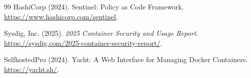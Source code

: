 \documentclass[11pt,twocolumn]{article}
\begin{document}
\begin{thebibliography}{99}
HashiCorp (2024).
\newblock Sentinel: Policy as Code Framework.
\newblock \url{https://www.hashicorp.com/sentinel}.

Sysdig, Inc. (2025).
\newblock \emph{2025 Container Security and Usage Report}.
\newblock \url{https://sysdig.com/2025-container-security-report/}.

SelfhostedPro (2024).
\newblock Yacht: A Web Interface for Managing Docker Containers.
\newblock \url{https://yacht.sh/}.

\end{thebibliography}
\end{document}
